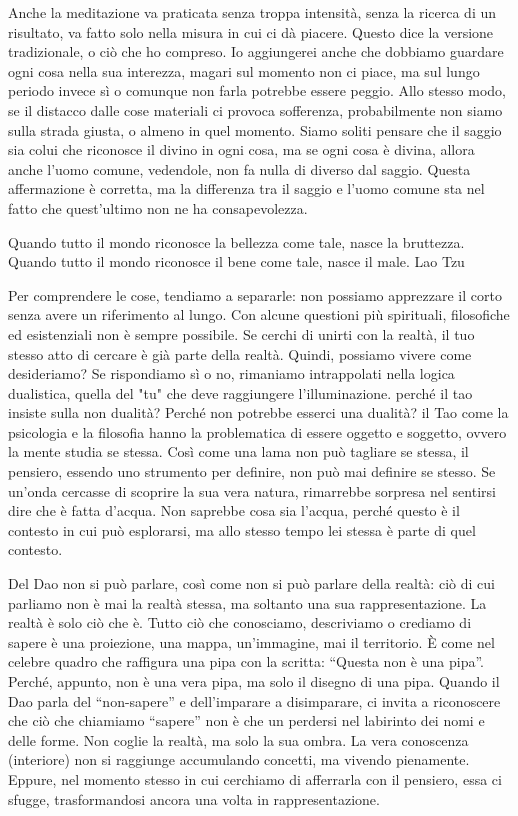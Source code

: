 \documentclass[12pt]{book} %
\begin{document}
Anche la meditazione va praticata senza troppa intensità, senza la ricerca di un risultato, va fatto solo nella misura in cui ci dà piacere. Questo dice la versione tradizionale, o ciò che ho compreso. Io aggiungerei anche che dobbiamo guardare ogni cosa nella sua interezza, magari sul momento non ci piace, ma sul lungo periodo invece sì o comunque non farla potrebbe essere peggio. Allo stesso modo, se il distacco dalle cose materiali ci provoca sofferenza, probabilmente non siamo sulla strada giusta, o almeno in quel momento.
Siamo soliti pensare che il saggio sia colui che riconosce il divino in ogni cosa, ma se ogni cosa è divina, allora anche l'uomo comune, vedendole, non fa nulla di diverso dal saggio. Questa affermazione è corretta, ma la differenza tra il saggio e l'uomo comune sta nel fatto che quest'ultimo non ne ha consapevolezza. 

Quando tutto il mondo riconosce la bellezza come tale, nasce la bruttezza.
Quando tutto il mondo riconosce il bene come tale, nasce il male.
Lao Tzu

Per comprendere le cose, tendiamo a separarle: non possiamo apprezzare il corto senza avere un riferimento al lungo. Con alcune questioni più spirituali, filosofiche ed esistenziali non è sempre possibile. 
Se cerchi di unirti con la realtà, il tuo stesso atto di cercare è già parte della realtà. Quindi, possiamo vivere come desideriamo? Se rispondiamo sì o no, rimaniamo intrappolati nella logica dualistica, quella del "tu" che deve raggiungere l'illuminazione.
perché il tao insiste sulla non dualità? Perché non potrebbe esserci una dualità? il Tao come la psicologia e la filosofia hanno la problematica di essere oggetto e soggetto, ovvero la mente studia se stessa. 
Così come una lama non può tagliare se stessa, il pensiero, essendo uno strumento per definire, non può mai definire se stesso.
Se un'onda cercasse di scoprire la sua vera natura, rimarrebbe sorpresa nel sentirsi dire che è fatta d'acqua. Non saprebbe cosa sia l'acqua, perché questo è il contesto in cui può esplorarsi, ma allo stesso tempo lei stessa è parte di quel contesto.

Del Dao non si può parlare, così come non si può parlare della realtà: ciò di cui parliamo non è mai la realtà stessa, ma soltanto una sua rappresentazione.
La realtà è solo ciò che è. Tutto ciò che conosciamo, descriviamo o crediamo di sapere è una proiezione, una mappa, un'immagine, mai il territorio.
È come nel celebre quadro che raffigura una pipa con la scritta: “Questa non è una pipa”. Perché, appunto, non è una vera pipa, ma solo il disegno di una pipa.
Quando il Dao parla del “non-sapere” e dell’imparare a disimparare, ci invita a riconoscere che ciò che chiamiamo “sapere” non è che un perdersi nel labirinto dei nomi e delle forme. Non coglie la realtà, ma solo la sua ombra.
La vera conoscenza (interiore) non si raggiunge accumulando concetti, ma vivendo pienamente. Eppure, nel momento stesso in cui cerchiamo di afferrarla con il pensiero, essa ci sfugge, trasformandosi ancora una volta in rappresentazione. 
\end{document}
